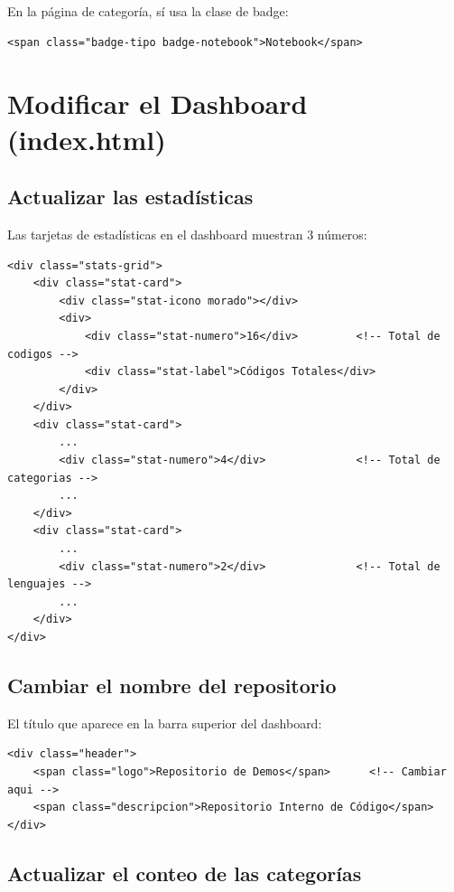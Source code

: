 \documentclass[12pt, a4paper]{article}
\begin{document}
En la página de categoría, sí usa la clase de badge:

\begin{lstlisting}[style=htmlstyle]
<span class="badge-tipo badge-notebook">Notebook</span>
\end{lstlisting}


\section{Modificar el Dashboard (index.html)}

\subsection{Actualizar las estadísticas}

Las tarjetas de estadísticas en el dashboard muestran 3 números:

\begin{lstlisting}[style=htmlstyle]
<div class="stats-grid">
    <div class="stat-card">
        <div class="stat-icono morado"></div>
        <div>
            <div class="stat-numero">16</div>         <!-- Total de codigos -->
            <div class="stat-label">Códigos Totales</div>
        </div>
    </div>
    <div class="stat-card">
        ...
        <div class="stat-numero">4</div>              <!-- Total de categorias -->
        ...
    </div>
    <div class="stat-card">
        ...
        <div class="stat-numero">2</div>              <!-- Total de lenguajes -->
        ...
    </div>
</div>
\end{lstlisting}

\subsection{Cambiar el nombre del repositorio}

El título que aparece en la barra superior del dashboard:

\begin{lstlisting}[style=htmlstyle]
<div class="header">
    <span class="logo">Repositorio de Demos</span>      <!-- Cambiar aqui -->
    <span class="descripcion">Repositorio Interno de Código</span>
</div>
\end{lstlisting}

\subsection{Actualizar el conteo de las categorías}
\end{document}
